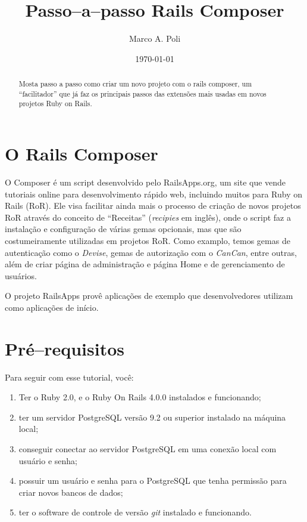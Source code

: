\documentclass[bidi]{tufte-handout}
\title{Passo--a--passo Rails Composer}
\author{Marco A. Poli}
\date{\today}
\begin{document}
\maketitle
\begin{abstract}
Mosta passo a passo como criar um novo projeto com o rails composer, um ``facilitador'' que já faz os principais passos das extensões mais usadas em novos projetos Ruby on Rails.
\end{abstract}

\section{O Rails Composer}

O Composer é um script desenvolvido pelo RailsApps.org, um site que vende tutoriais online para desenvolvimento rápido web, incluindo muitos para Ruby on Rails (RoR). Ele visa facilitar ainda mais o processo de criação de novos projetos RoR através do conceito de ``Receitas'' (\emph{recipies} em inglês), onde o script faz a instalação e configuração de várias gemas opcionais, mas que são costumeiramente utilizadas em projetos RoR. Como examplo, temos gemas de autenticação como o \emph{Devise}, gemas de autorização com o \emph{CanCan}, entre outras, além de criar página de administração e página Home e de gerenciamento de usuários.

O projeto RailsApps provê aplicações de exemplo que desenvolvedores utilizam como aplicações de início.\cite{rails_apps_composer}

\section{Pré--requisitos}
Para seguir com esse tutorial, você:

\begin{enumerate}
  \item Ter o Ruby 2.0, e o Ruby On Rails 4.0.0 instalados e funcionando;
  \item ter um servidor PostgreSQL versão 9.2 ou superior instalado na máquina local;
  \item conseguir conectar ao servidor PostgreSQL em uma conexão local com usuário e senha;
  \item possuir um usuário e senha para o PostgreSQL que tenha permissão para criar novos bancos de dados;
  \item ter o software de controle de versão \emph{git} instalado e funcionando.
\end{enumerate}
\end{document}
